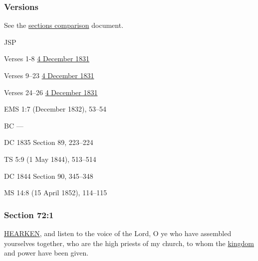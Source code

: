 	\subsubsection{Versions}
		\label{DC72-V}
		
		See the \href{https://drive.google.com/file/d/1goAvNz8jS4R8slYfMG_db55Ty2z_vmgK/view?usp=sharing}{sections comparison} document.
	
		\begin{compactdesc}
			\item[JSP] \phantom{.}
				\begin{compactdesc}
					\item[Verses 1-8] \hyperref[EMS-1831-JS-4-DEC-1831-A]{4 December 1831}
					\item[Verses 9--23] \hyperref[EMS-1831-JS-4-DEC-1831-B]{4 December 1831}
					\item[Verses 24--26] \hyperref[EMS-1831-JS-4-DEC-1831-C]{4 December 1831}
				\end{compactdesc}
			\item[EMS] 1:7 (December 1832), 53--54
			\item[BC] ---
			\item[DC 1835] Section 89, 223--224
			\item[TS] 5:9 (1 May 1844), 513--514
			\item[DC 1844] Section 90, 345--348
			\item[MS] 14:8 (15 April 1852), 114--115
		\end{compactdesc}

	\subsubsection{Section 72:1} %
		\label{DC72-1}

		\hyperref[HEARKEN]{HEARKEN}, and listen to the voice of the Lord, O ye who have assembled yourselves together, who are the high priests of my church, to whom the \hyperref[KINGDOM]{kingdom} and power have been given.


